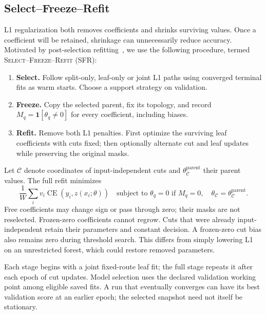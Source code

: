 \documentclass[11pt,a4paper]{article}
\newcommand{\SFR}{\textsc{Select--Freeze--Refit}}
\newcommand{\CE}{\operatorname{CE}}
\newcommand{\ind}{\mathbf{1}}
\begin{document}
\subsection{Select--Freeze--Refit}
L1 regularization both removes coefficients and shrinks surviving values.
Once a coefficient will be retained, shrinkage can unnecessarily reduce
accuracy. Motivated by post-selection refitting~\cite{relaxed}, we use the
following procedure, termed \SFR{} (SFR):
\begin{enumerate}
\item \textbf{Select.} Follow split-only, leaf-only or joint L1 paths using
converged terminal fits as warm starts. Choose a support strategy on validation.
\item \textbf{Freeze.} Copy the selected parent, fix its topology, and record
$M_q=\ind[\theta_q\ne0]$ for every coefficient, including biases.
\item \textbf{Refit.} Remove both L1 penalties. First optimize the surviving
leaf coefficients with cuts fixed; then optionally alternate cut and leaf
updates while preserving the original masks.
\end{enumerate}
Let $\mathcal C$ denote coordinates of input-independent cuts and
$\theta_{\mathcal C}^{\mathrm{parent}}$ their parent values. The full refit minimizes
\begin{equation}
 \frac1W\sum_i v_i\CE(y_i,z(x_i;\theta))
 \quad\text{subject to }\theta_q=0\text{ if }M_q=0,\quad
 \theta_{\mathcal C}=\theta_{\mathcal C}^{\mathrm{parent}}.
 \label{eq:frozen}
\end{equation}
Free coefficients may change sign or pass through zero; their masks are not
reselected. Frozen-zero coefficients cannot regrow. Cuts that were already
input-independent retain their parameters and constant decision. A frozen-zero cut bias
also remains zero during threshold search. This differs from simply lowering
L1 on an unrestricted forest, which could restore removed parameters.

Each stage begins with a joint fixed-route leaf fit; the full stage repeats
it after each epoch of cut updates. Model selection uses the declared
validation working point among eligible saved fits. A run that eventually
converges can have its best validation score at an earlier epoch; the selected
snapshot need not itself be stationary.
\end{document}
